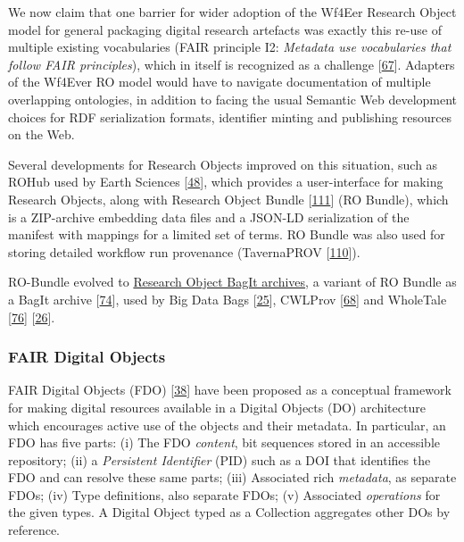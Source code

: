 We now claim that one barrier for wider adoption of the Wf4Eer Research
Object model for general packaging digital research artefacts was
exactly this re-use of multiple existing vocabularies (FAIR principle
I2: \emph{Metadata use vocabularies that follow FAIR principles}), which
in itself is recognized as a challenge
{[}\href{https://doi.org/10.3233/978-1-61499-660-6-9}{67}{]}. Adapters
of the Wf4Ever RO model would have to navigate documentation of multiple
overlapping ontologies, in addition to facing the usual Semantic Web
development choices for RDF serialization formats, identifier minting
and publishing resources on the Web.

Several developments for Research Objects improved on this situation,
such as ROHub used by Earth Sciences
{[}\href{https://arxiv.org/abs/1809.10617}{48}{]}, which provides a
user-interface for making Research Objects, along with Research Object
Bundle {[}\href{https://w3id.org/bundle/2014-11-05/}{111}{]} (RO
Bundle), which is a ZIP-archive embedding data files and a JSON-LD
serialization of the manifest with mappings for a limited set of terms.
RO Bundle was also used for storing detailed workflow run provenance
(TavernaPROV
{[}\href{https://s11.no/2016/provweek-tavernaprov/}{110}{]}).

RO-Bundle evolved to \href{https://w3id.org/ro/bagit}{Research Object
BagIt archives}, a variant of RO Bundle as a BagIt archive
{[}\href{https://doi.org/10.17487/rfc8493}{74}{]}, used by Big Data Bags
{[}\href{https://www.research.manchester.ac.uk/portal/files/45989205/bagminid.pdf}{25}{]},
CWLProv {[}\href{https://doi.org/10.1093/gigascience/giz095}{68}{]} and
WholeTale {[}\href{https://doi.org/10.3233/APC200107}{76}{]}
{[}\href{https://doi.org/10.1109/eScience.2019.00068}{26}{]}.

\hypertarget{fair-digital-objects}{%
\subsubsection{FAIR Digital Objects}\label{fair-digital-objects}}

FAIR Digital Objects (FDO)
{[}\href{https://doi.org/10.3390/publications8020021}{38}{]} have been
proposed as a conceptual framework for making digital resources
available in a Digital Objects (DO) architecture which encourages active
use of the objects and their metadata. In particular, an FDO has five
parts: (i) The FDO \emph{content}, bit sequences stored in an accessible
repository; (ii) a \emph{Persistent Identifier} (PID) such as a DOI that
identifies the FDO and can resolve these same parts; (iii) Associated
rich \emph{metadata}, as separate FDOs; (iv) Type definitions, also
separate FDOs; (v) Associated \emph{operations} for the given types. A
Digital Object typed as a Collection aggregates other DOs by reference.

